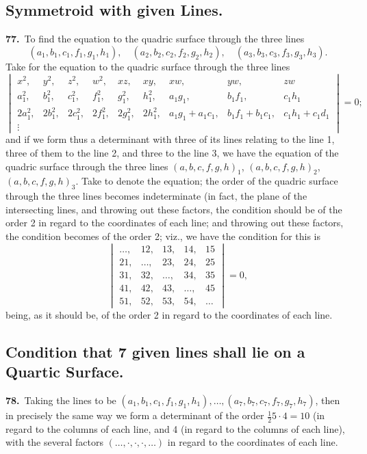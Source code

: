 \documentclass[11pt,a4paper]{article}
\begin{document}
\subsection*{Symmetroid with given Lines.}

\noindent\textbf{77.}\ To find the equation to the quadric surface through the three lines
\[
(a_1, b_1, c_1, f_1, g_1, h_1),\quad (a_2, b_2, c_2, f_2, g_2, h_2),\quad (a_3, b_3, c_3, f_3, g_3, h_3).
\]
Take for the equation to the quadric surface through the three lines
\[
\begin{vmatrix}
x^2, & y^2, & z^2, & w^2, & xz, & xy, & xw, & yw, & zw \\
a_1^2, & b_1^2, & c_1^2, & f_1^2, & g_1^2, & h_1^2, & a_1g_1, & b_1f_1, & c_1h_1 \\
2a_1^2, & 2b_1^2, & 2c_1^2, & 2f_1^2, & 2g_1^2, & 2h_1^2, & a_1g_1 + a_1c_1, & b_1f_1 + b_1c_1, & c_1h_1 + c_1d_1 \\
\vdots & & & & & & & &
\end{vmatrix} = 0;
\]
and if we form thus a determinant with three of its lines relating to the line 1, three of them to the line 2, and three to the line 3, we have the equation of the quadric surface through the three lines $(a, b, c, f, g, h)_1$, $(a, b, c, f, g, h)_2$, $(a, b, c, f, g, h)_3$. Take to denote the equation; the order of the quadric surface through the three lines becomes indeterminate (in fact, the plane of the intersecting lines, and throwing out these factors, the condition should be of the order 2 in regard to the coordinates of each line; and throwing out these factors, the condition becomes of the order 2; viz., we have the condition for this is
\[
\begin{vmatrix}
\ldots, & 12, & 13, & 14, & 15 \\
21, & \ldots, & 23, & 24, & 25 \\
31, & 32, & \ldots, & 34, & 35 \\
41, & 42, & 43, & \ldots, & 45 \\
51, & 52, & 53, & 54, & \ldots
\end{vmatrix} = 0,
\]
being, as it should be, of the order 2 in regard to the coordinates of each line.

\subsection*{Condition that 7 given lines shall lie on a Quartic Surface.}

\noindent\textbf{78.}\ Taking the lines to be $(a_1, b_1, c_1, f_1, g_1, h_1), \ldots, (a_7, b_7, c_7, f_7, g_7, h_7)$, then in precisely the same way we form a determinant of the order $\frac{1}{2}5\cdot 4 = 10$ (in regard to the columns of each line, and 4 (in regard to the columns of each line), with the several factors $(\ldots, \cdot, \cdot, \cdot, \ldots)$ in regard to the coordinates of each line.
\end{document}
